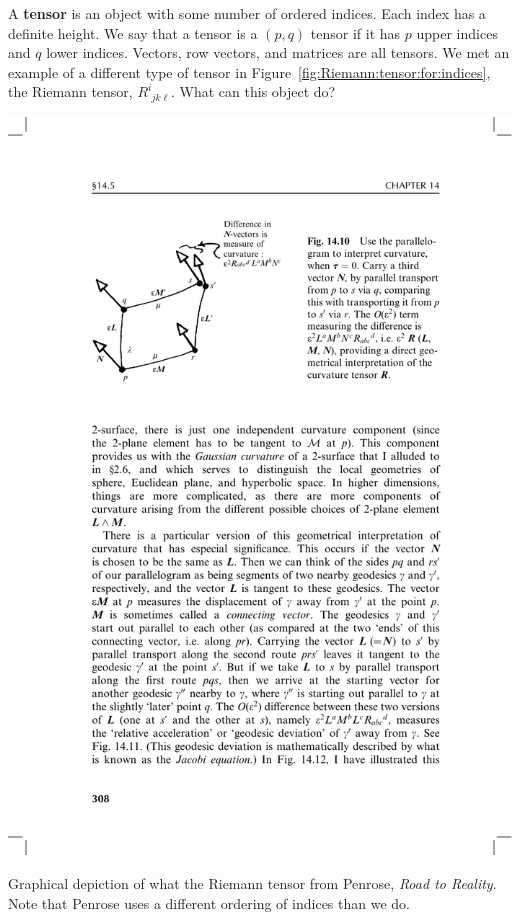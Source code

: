 \documentclass[12pt, oneside]{report}    %
\begin{document}
A \textbf{tensor} is an object with some number of ordered indices. Each index has a definite height. We say that a tensor is a $(p,q)$ tensor if it has $p$ upper indices and $q$ lower indices. Vectors, row vectors, and matrices are all tensors. We met an example of a different type of tensor in Figure~\ref{fig:Riemann:tensor:for:indices}, the Riemann tensor, $R^i_{\phantom{i}jk\ell}$. What can this object do? 
\begin{marginfigure}%
    \includegraphics[width=.8\textwidth]{figures/Penrose_Riemann_14_10.pdf}
    \caption{Graphical depiction of what the Riemann tensor from Penrose, \emph{Road to Reality}. Note that Penrose uses a different ordering of indices than we do.}
    \label{fig:Penrose:14:10:Riemann}
\end{marginfigure}
\end{document}
